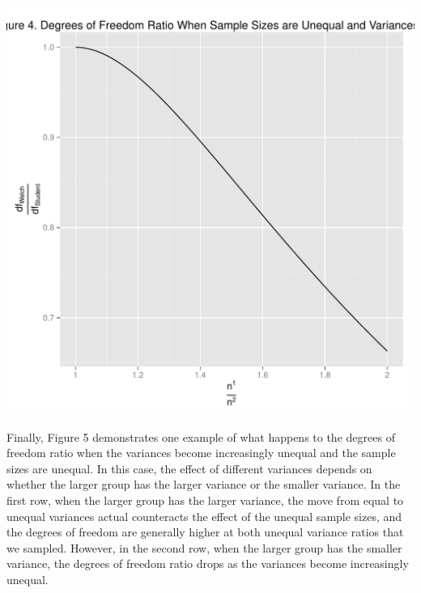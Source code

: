 \documentclass[man,a4paper,noextraspace]{apa6}\usepackage[]{graphicx}\usepackage[]{color}
\makeatletter
\def\maxwidth{ %
  \ifdim\Gin@nat@width>\linewidth
    \linewidth
  \else
    \Gin@nat@width
  \fi
}
\newenvironment{knitrout}{}{} %
\makeatother
\begin{document}
\begin{knitrout}
\color{fgcolor}
\includegraphics[width=\maxwidth]{figure/dfratiosDiffNratios} 

\end{knitrout}

    Finally, Figure 5 demonstrates one example of what happens to the degrees of freedom ratio when the variances become increasingly unequal and the sample sizes are unequal. In this case, the effect of different variances depends on whether the larger group has the larger variance or the smaller variance. In the first row, when the larger group has the larger variance, the move from equal to unequal variances actual counteracts the effect of the unequal sample sizes, and the degrees of freedom are generally higher at both unequal variance ratios that we sampled. However, in the second row, when the larger group has the smaller variance, the degrees of freedom ratio drops as the variances become increasingly unequal. 
\end{document}
